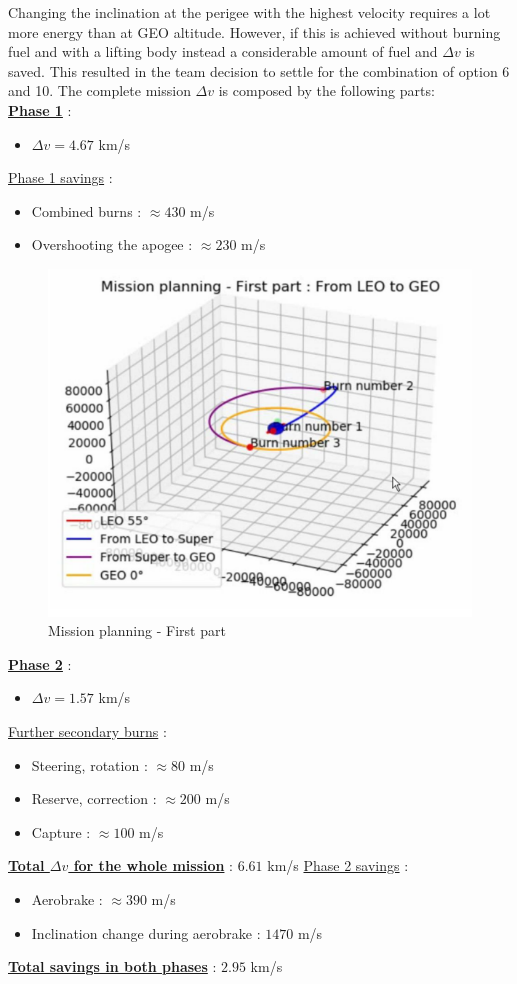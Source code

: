 Changing the inclination at the perigee with the highest velocity requires a lot more energy than at GEO
altitude. However, if this is achieved without burning fuel and with a lifting body instead a considerable amount of fuel and $\Delta v$ is saved. This resulted in the team decision to settle for the combination of option 6 and 10. The complete mission $\Delta v$ is composed by the following parts:\\
\textbf{\underline{Phase 1}} :
\begin{itemize}
	\item $\Delta v = 4.67$ km/s
\end{itemize}
{\underline{Phase 1 savings}} :
\begin{itemize}
	\item Combined burns : $\approx 430$ m/s
	\item Overshooting the apogee : $\approx 230$ m/s
\end{itemize}
\begin{figure}[H]
	\centering\includegraphics[width=0.6\linewidth]{mission1}
	\caption{Mission planning - First part}
\end{figure}
\textbf{\underline{Phase 2}} :
\begin{itemize}
	\item $\Delta v = 1.57$ km/s
\end{itemize}
{\underline{Further secondary burns}} :
\begin{itemize}
	\item Steering, rotation : $\approx 80$ m/s
	\item Reserve, correction : $\approx 200$ m/s
	\item Capture : $\approx 100$ m/s
\end{itemize}
\underline{\textbf{Total $\Delta v$ for the whole mission}} : $6.61$ km/s
{\underline{Phase 2 savings}} :
\begin{itemize}
	\item Aerobrake : $\approx 390$ m/s
	\item Inclination change during aerobrake : $1470$ m/s
\end{itemize}
\underline{\textbf{Total savings in both phases}} : $2.95$ km/s\\

